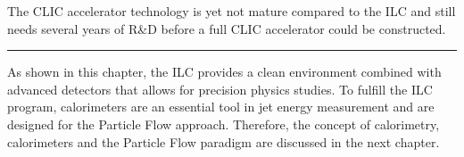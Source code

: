 The CLIC accelerator technology is yet not mature compared to the ILC and still needs several years of R\&D before a full CLIC accelerator could be constructed.

\begin{center}
  \rule{0.5\textwidth}{.4pt}
\end{center}

As shown in this chapter, the ILC provides a clean environment combined with advanced detectors that allows for precision physics studies. To fulfill the ILC program, calorimeters are an essential tool in jet energy measurement and are designed for the Particle Flow approach. Therefore, the concept of calorimetry, calorimeters and the Particle Flow paradigm are discussed in the next chapter.
